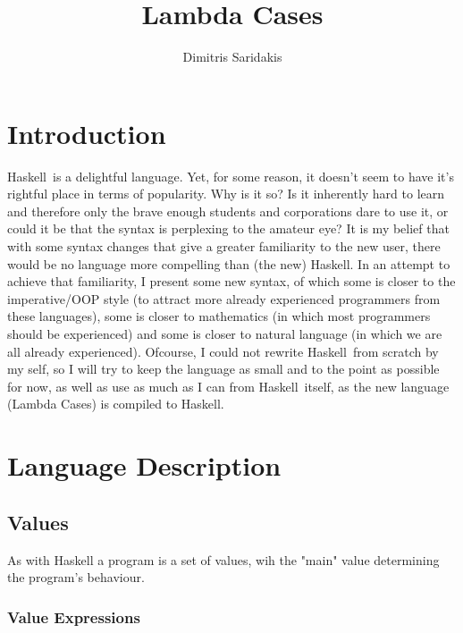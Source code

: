 \documentclass{article}
\date{}
\author{
  Dimitris Saridakis
}
\def\H{Haskell}
\begin{document}
\title{
\textbf{Lambda Cases}
}
\maketitle

\section{Introduction}

\H\ is a delightful language. Yet, for some reason, it doesn't seem to have it's 
rightful place in terms of popularity. Why is it so? Is it inherently hard to learn
and therefore only the brave enough students and corporations dare to use it, or
could it be that the syntax is perplexing to the amateur eye? It is my belief that 
with some syntax changes that give a greater familiarity to the new user, there
would be no language more compelling than (the new) \H. In an attempt to achieve
that familiarity, I present some new syntax, of which
some is closer to the imperative/OOP style (to attract more already experienced
programmers from these languages), some is closer to mathematics (in which most 
programmers should be experienced) and some is closer to natural language
(in which we are all already experienced). Ofcourse, I could not rewrite \H\
from scratch by my self, so I will try to keep the language as small and to the 
point as possible for now, as well as use as much as I can from \H\ itself, as 
the new language (Lambda Cases) is compiled to \H.

\section{Language Description}

\subsection{Values}

As with Haskell a program is a set of values, wih the "main" value determining 
the program's behaviour.

\subsubsection{Value Expressions}
\end{document}
